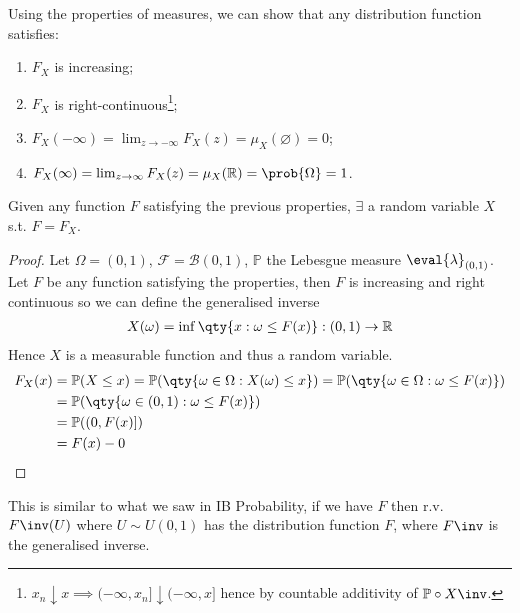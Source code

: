Using the properties of measures, we can show that any distribution function satisfies:

\begin{enumerate}
	\item $F_X$ is increasing;
	\item $F_X$ is right-continuous\footnote{$x_n \downarrow x \implies (-\infty, x_n] \downarrow (-\infty, x]$ hence by countable additivity of $\mathbb{P} \circ X\inv$.};
	\item $F_X(-\infty) = \lim_{z \to -\infty} F_X(z) = \mu_X(\varnothing) = 0$;
	\item $F_X(\infty) = \lim_{z \to \infty} F_X(z) = \mu_X(\mathbb R) = \prob{\Omega} = 1$.
\end{enumerate}

\begin{proposition}
	Given any function $F$ satisfying the previous properties, $\exists$ a random variable $X$ s.t. $F = F_X$.
\end{proposition}

\begin{proof}
	Let $\Omega = (0, 1)$, $\mathcal{F} = \mathcal{B}(0, 1)$, $\mathbb{P}$ the Lebesgue measure $\eval{\lambda}_{(0, 1)}$. \\
	Let $F$ be any function satisfying the properties, then $F$ is increasing and right continuous so we can define the generalised inverse
	\begin{align*}
		X(\omega) = \inf\qty{x : \omega \leq F(x)} : (0, 1) \to \mathbb{R}
	\end{align*}
	Hence $X$ is a measurable function and thus a random variable.
	\begin{align*}
		F_X(x) &= \mathbb{P}(X \leq x) = \mathbb{P}(\qty{\omega \in \Omega : X(\omega) \leq x}) = \mathbb{P}(\qty{\omega \in \Omega : \omega \leq F(x)}) \\
		&= \mathbb{P}(\qty{\omega \in (0, 1) : \omega \leq F(x)}) \\
		&= \mathbb{P}((0, F(x)]) \\
		&= F(x) - 0
	\end{align*}
\end{proof}

\begin{remark}
	This is similar to what we saw in IB Probability, if we have $F$ then r.v. $F\inv(U)$ where $U \sim U(0, 1)$ has the distribution function $F$, where $F\inv$ is the generalised inverse.
\end{remark}

